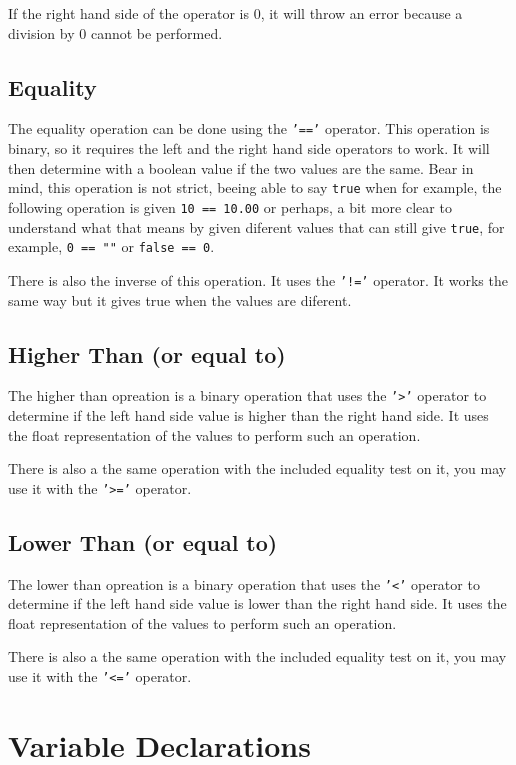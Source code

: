 If the right hand side of the operator is 0, it will throw an error because a division by 0 cannot be performed.

\subsection{Equality}

The equality operation can be done using the \texttt{'=='} operator. This operation is binary, so it requires the left and the
right hand side operators to work. It will then determine with a boolean value if the two values are the same. Bear in mind, this
operation is not strict, beeing able to say \texttt{true} when for example, the following operation is given \texttt{10 == 10.00}
or perhaps, a bit more clear to understand what that means by given diferent values that can still give \texttt{true}, for example,
\texttt{0 == ""} or \texttt{false == 0}.

There is also the inverse of this operation. It uses the \texttt{'!='} operator. It works the same way but it gives
true when the values are diferent.

\subsection{Higher Than (or equal to)}

The higher than opreation is a binary operation that uses the \texttt{'>'} operator to determine if the left hand side value is
higher than the right hand side. It uses the float representation of the values to perform such an operation.

There is also a the same operation with the included equality test on it, you may use it with the \texttt{'>='} operator.

\subsection{Lower Than (or equal to)}

The lower than opreation is a binary operation that uses the \texttt{'<'} operator to determine if the left hand side value is
lower than the right hand side. It uses the float representation of the values to perform such an operation.

There is also a the same operation with the included equality test on it, you may use it with the \texttt{'<='} operator.

\section{Variable Declarations}

